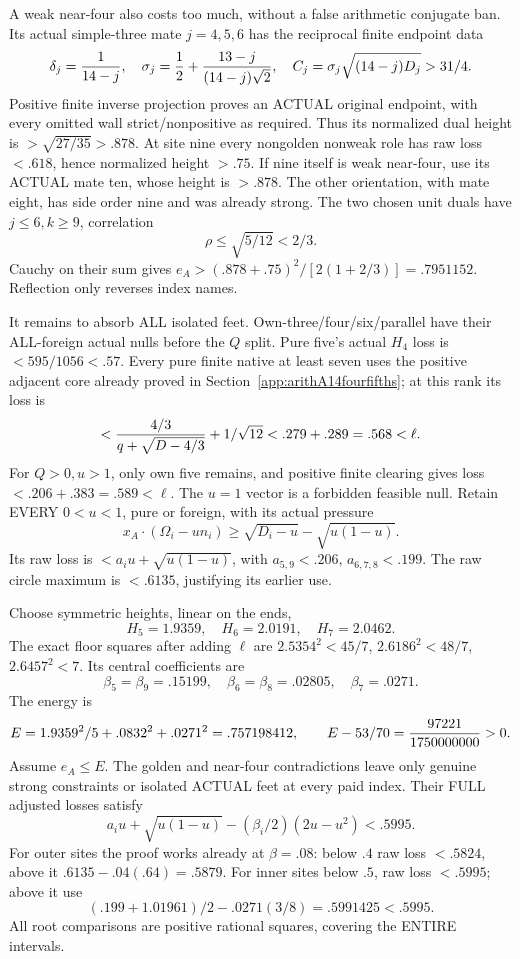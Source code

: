 A weak near-four also costs too much, without
a false arithmetic conjugate ban.
Its actual simple-three mate \(j=4,5,6\) has
the reciprocal finite endpoint data
\[
 \delta_j={1\over14-j},\quad
 \sigma_j={1\over2}+{13-j\over(14-j)\sqrt2},\quad
 C_j=\sigma_j\sqrt{(14-j)D_j}>31/4 .
\]
Positive finite inverse projection proves an
ACTUAL original endpoint, with every omitted
wall strict/nonpositive as required.
Thus its normalized dual height is
\(>\sqrt{27/35}>.878\).
At site nine every nongolden nonweak role has
raw loss \(<.618\), hence normalized height
\(>.75\).
If nine itself is weak near-four, use its
ACTUAL mate ten, whose height is \(>.878\).
The other orientation, with mate eight, has
side order nine and was already strong.
The two chosen unit duals have \(j\le6,k\ge9\),
correlation
\[
                         \rho\le\sqrt{5/12}<2/3 .
\]
Cauchy on their sum gives
\(e_A>(.878+.75)^2/[2(1+2/3)]=.7951152\).
Reflection only reverses index names.

It remains to absorb ALL isolated feet.
Own-three/four/six/parallel have their ALL-foreign
actual nulls before the \(Q\) split.
Pure five's actual \(H_4\) loss is
\(<595/1056<.57\).
Every pure finite native at least seven uses
the positive adjacent core already proved in
Section~\ref{app:arithA14fourfifths};
at this rank its loss is
\[
        <{4/3\over q+\sqrt{D-4/3}}+1/\sqrt{12}
                       <.279+.289=.568<\ell .
\]
For \(Q>0,u>1\), only own five remains,
and positive finite clearing gives loss
\(<.206+.383=.589<\ell\).
The \(u=1\) vector is a forbidden feasible null.
Retain EVERY \(0<u<1\), pure or foreign,
with its actual pressure
\[
 x_A\cdot(\Omega_i-un_i)\ge
                      \sqrt{D_i-u}-\sqrt{u(1-u)}.
\]
Its raw loss is
\(<a_i u+\sqrt{u(1-u)}\),
with \(a_{5,9}<.206\), \(a_{6,7,8}<.199\).
The raw circle maximum is \(<.6135\),
justifying its earlier use.

Choose symmetric heights, linear on the ends,
\[
                         H_5=1.9359,\quad H_6=2.0191,\quad H_7=2.0462.
\]
The exact floor squares after adding \(\ell\) are
\(2.5354^2<45/7\), \(2.6186^2<48/7\),
\(2.6457^2<7\).
Its central coefficients are
\[
                    \beta_5=\beta_9=.15199,\quad
                    \beta_6=\beta_8=.02805,\quad\beta_7=.0271 .
\]
The energy is
\[
 E=1.9359^2/5+.0832^2+.0271^2=.757198412,\qquad
 E-53/70={97221\over1750000000}>0 .
\]
Assume \(e_A\le E\).
The golden and near-four contradictions leave
only genuine strong constraints or isolated
ACTUAL feet at every paid index.
Their FULL adjusted losses satisfy
\[
               a_i u+\sqrt{u(1-u)}
                          -(\beta_i/2)(2u-u^2)<.5995 .
\]
For outer sites the proof works already at
\(\beta=.08\):
below \(.4\) raw loss \(<.5824\), above it
\(.6135-.04(.64)=.5879\).
For inner sites below \(.5\), raw loss \(<.5995\);
above it use
\[
              (.199+1.01961)/2-.0271(3/8)
                                   =.5991425<.5995 .
\]
All root comparisons are positive rational
squares, covering the ENTIRE intervals.

